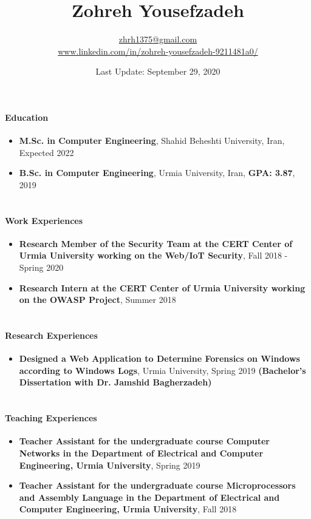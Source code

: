 \documentclass[12pt]{article}
\title{Zohreh Yousefzadeh}
\date{Last Update: September 29, 2020}
\author{\href{mailto:zhrh1375@gmail.com}{zhrh1375@gmail.com}\\ \url{www.linkedin.com/in/zohreh-yousefzadeh-9211481a0/}}
\begin{document}
\maketitle

\paragraph{Education}
\begin{itemize}
	\item \textbf{M.Sc. in Computer Engineering}, Shahid Beheshti University, Iran, Expected 2022
	\item \textbf{B.Sc. in Computer Engineering}, Urmia University, Iran, \textbf{GPA: 3.87}, 2019
\end{itemize}

\paragraph{\\Work Experiences}
\begin{itemize}
	\item \textbf{Research Member of the Security Team at the CERT Center of Urmia University working on the Web/IoT Security}, Fall 2018 - Spring 2020
	\item \textbf{Research Intern at the CERT Center of Urmia University working on the OWASP Project}, Summer 2018
\end{itemize}

\paragraph{\\Research Experiences}
\begin{itemize}
	\item \textbf{Designed a Web Application to Determine Forensics on Windows according to Windows Logs}, Urmia University, Spring 2019 \textbf{(Bachelor's Dissertation with Dr. Jamshid Bagherzadeh)}
\end{itemize}

\paragraph{\\Teaching Experiences}
\begin{itemize}
	\item \textbf{Teacher Assistant for the undergraduate course Computer Networks in the Department of Electrical and Computer Engineering, Urmia University}, Spring 2019
	\item \textbf{Teacher Assistant for the undergraduate course Microprocessors and Assembly Language in the Department of Electrical and Computer Engineering, Urmia University}, Fall 2018
\end{itemize}
\end{document}
